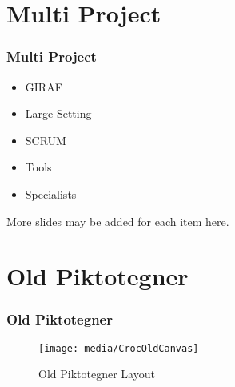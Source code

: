 \section{Multi Project}
\begin{frame}
\frametitle{Multi Project}
	\begin{itemize}
	\item GIRAF
	\item Large Setting
	\item SCRUM
	\item Tools
	\item Specialists
	\end{itemize}
	More slides may be added for each item here.
\end{frame}
	
	
\section{Old Piktotegner}
	\begin{frame}
	\frametitle{Old Piktotegner}
	\begin{figure}
		\texttt{[image: media/CrocOldCanvas]}
		\caption{Old Piktotegner Layout}
	\end{figure}
	\end{frame}